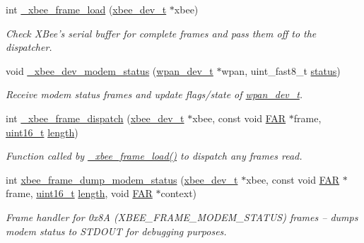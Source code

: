 \begin{DoxyCompactItemize}
int \hyperlink{group__xbee__device_gac0874f9422c6588062a4b6205e989fc6}{\-\_\-xbee\-\_\-frame\-\_\-load} (\hyperlink{structxbee__dev__t}{xbee\-\_\-dev\-\_\-t} $\ast$xbee)
\begin{DoxyCompactList}\small\item\em Check X\-Bee's serial buffer for complete frames and pass them off to the dispatcher. \end{DoxyCompactList}\item 
void \hyperlink{group__xbee__device_gaa9c3bed7ca20dbb2cf4646811c59fe97}{\-\_\-xbee\-\_\-dev\-\_\-modem\-\_\-status} (\hyperlink{structwpan__dev__t}{wpan\-\_\-dev\-\_\-t} $\ast$wpan, uint\-\_\-fast8\-\_\-t \hyperlink{group__xbee__atcmd_gade818037fd6c985038ff29656089758d}{status})
\begin{DoxyCompactList}\small\item\em Receive modem status frames and update flags/state of \hyperlink{structwpan__dev__t}{wpan\-\_\-dev\-\_\-t}. \end{DoxyCompactList}\item 
int \hyperlink{group__xbee__device_gab386cd9e1afe784ab79b3139fe8fc5c8}{\-\_\-xbee\-\_\-frame\-\_\-dispatch} (\hyperlink{structxbee__dev__t}{xbee\-\_\-dev\-\_\-t} $\ast$xbee, const void \hyperlink{group__hal_gaef060b3456fdcc093a7210a762d5f2ed}{F\-A\-R} $\ast$frame, \hyperlink{group__hal_ga5a8b2dc9e45a9ee81a94ef304fb62505}{uint16\-\_\-t} \hyperlink{group__zdo_gab2b3adeb2a67e656ff030b56727fd0ac}{length})
\begin{DoxyCompactList}\small\item\em Function called by \hyperlink{group__xbee__device_gac0874f9422c6588062a4b6205e989fc6}{\-\_\-xbee\-\_\-frame\-\_\-load()} to dispatch any frames read. \end{DoxyCompactList}\item 
int \hyperlink{group__xbee__device_gae54cdc832021172ae535a449856450b7}{xbee\-\_\-frame\-\_\-dump\-\_\-modem\-\_\-status} (\hyperlink{structxbee__dev__t}{xbee\-\_\-dev\-\_\-t} $\ast$xbee, const void \hyperlink{group__hal_gaef060b3456fdcc093a7210a762d5f2ed}{F\-A\-R} $\ast$frame, \hyperlink{group__hal_ga5a8b2dc9e45a9ee81a94ef304fb62505}{uint16\-\_\-t} \hyperlink{group__zdo_gab2b3adeb2a67e656ff030b56727fd0ac}{length}, void \hyperlink{group__hal_gaef060b3456fdcc093a7210a762d5f2ed}{F\-A\-R} $\ast$context)
\begin{DoxyCompactList}\small\item\em Frame handler for 0x8\-A (X\-B\-E\-E\-\_\-\-F\-R\-A\-M\-E\-\_\-\-M\-O\-D\-E\-M\-\_\-\-S\-T\-A\-T\-U\-S) frames -- dumps modem status to S\-T\-D\-O\-U\-T for debugging purposes. \end{DoxyCompactList}\item 

\end{DoxyCompactItemize}
